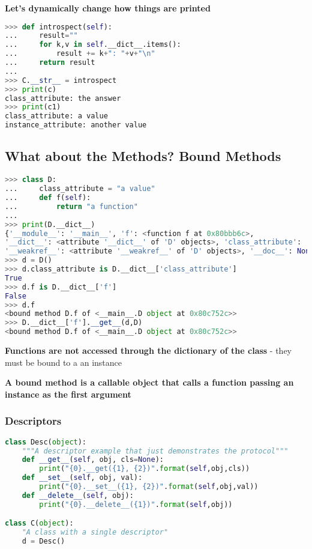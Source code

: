 \textbf{Let’s dynamically change how things are printed}

\begin{lstlisting}[language=Python]
>>> def introspect(self):
... 	result=""
... 	for k,v in self.__dict__.items():
... 		result += k+": "+v+"\n"
... 	return result
...
>>> C.__str__ = introspect
>>> print(c)
class_attribute: the answer
>>> print(c1)
class_attribute: a value
instance_attribute: another value
\end{lstlisting}

\subsection{What about the Methods? Bound Methods}

\begin{lstlisting}[language=Python]
>>> class D:
... 	class_attribute = "a value"
... 	def f(self):
... 		return "a function"
...
>>> print(D.__dict__)
{'__module__': '__main__', 'f': <function f at 0x80bbb6c>,
'__dict__': <attribute '__dict__' of 'D' objects>, 'class_attribute': 'a value',
'__weakref__': <attribute '__weakref__' of 'D' objects>, '__doc__': None}
>>> d = D()
>>> d.class_attribute is D.__dict__['class_attribute']
True
>>> d.f is D.__dict__['f']
False
>>> d.f
<bound method D.f of <__main__.D object at 0x80c752c>>
>>> D.__dict__['f'].__get__(d,D)
<bound method D.f of <__main__.D object at 0x80c752c>>
\end{lstlisting}

\textbf{Functions are not accessed through the dictionary of the class}
	- they must be bound to a an instance

\textbf{A bound method is a callable object that calls a function passing an instance as the first argument}

\subsubsection{Descriptors}

\begin{lstlisting}[language=Python]
class Desc(object):
	"""A descriptor example that just demonstrates the protocol"""
	def __get__(self, obj, cls=None):
		print("{0}.__get({1}, {2})".format(self,obj,cls))
	def __set__(self, obj, val):
		print("{0}.__set__({1}, {2})".format(self,obj,val))
	def __delete__(self, obj):
		print("{0}.__delete__({1})".format(self,obj))

class C(object):
	"A class with a single descriptor"
	d = Desc()
\end{lstlisting}

